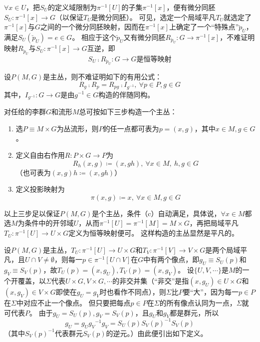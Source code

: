 \begin{note}
    $\forall x \in U$，把$S_U$的定义域限制为$\pi^{-1}[U]$的子集$\pi^{-1}[x]$，便有微分同胚$S_U \colon \pi^{-1}[x] \to G$（以保证$T_U$是微分同胚）。
    可见，选定一个局域平凡$T_U$就选定了$\pi^{-1}[x]$与$G$之间的一个微分同胚映射，因而在$\pi^{-1}[x]$上确定了一个``特殊点''$\breve{p}_U$，满足$S_U(\breve{p}_U) = e \in G$。
    相应于这个$\breve{p}_U$又有微分同胚$R_{\breve{p}_U} \colon G \to \pi^{-1}[x]$，不难证明映射$R_{\breve{p}_U}$与$S_U \colon \pi^{-1}[x] \to G$互逆，即
    $$S_U \comp R_{\breve{p}_U} \colon G \to G \text{是恒等映射}$$
\end{note}

\begin{note}
    设$P(M, G)$是主丛，则不难证明如下的有用公式：
    $$R_g \comp R_p = R_{pg} \comp I_{g^{-1}}, ~ \forall p \in P, g \in G$$
    其中，$I_{g^{-1}} \colon G \to G$是由$g^{-1} \in G$构造的伴随同构。
\end{note}

\begin{example}
    对任给的李群$G$和流形$M$总可按如下三步构造一个主丛：
    \begin{enumerate}[（1）]
        \item 选$P \equiv M \times G$为丛流形，则$P$的任一点都可表为$p = (x, g)$，其中$x \in M, g \in G$。
        \item 定义自由右作用$R \colon P \times G \to P$为
        $$R_h(x, g) \coloneq (x, gh), ~ \forall x \in M, ~ h,g \in G$$
        （也可表为$(x, g)h \coloneq (x, gh)$）
        \item 定义投影映射为
        $$\pi(x, g) \coloneq x, ~ \forall x \in M, g \in G$$
    \end{enumerate}
    以上三步足以保证$P(M, G)$是个主丛，条件（c）自动满足，具体说，$\forall x \in M$都选$M$为条件中的开邻域$U$，从而$\pi^{-1}[U] = \pi^{-1}[M] = M \times G$，再把局域平凡$T_U \colon \pi^{-1}[U] \to U \times G$定义为恒等映射便可。
    这样构造的主丛显然是平凡的。
\end{example}

设$P(M, G)$是主丛，$T_U \colon \pi^{-1}[U] \to U \times G$和$T_V \colon \pi^{-1}[V] \to V \times G$是两个局域平凡，且$U \cap V \neq \emptyset$，则每一$p \in \pi^{-1}[U \cap V]$在$G$中有两个像点，即$g_U \equiv S_U(p)$和$g_V \equiv S_V(p)$，故$T_U(p) = (x, g_U), T_V(p) = (x, g_V)$。
设$\{U, V, \cdots\}$是$M$的一个开覆盖，以$\Sigma$代表$U \times G, V \times G, \cdots$的非交并集（``非交''是指$(x, g_U) \in U \times G$和$(x, g_V) \in V \times G$即使在$g_U = g_V$时也看作不同点），则$\Sigma$比$P$要``大''，因为每一$p \in P$在$\Sigma$中对应不止一个像点。
但只要把每点$p \in P$在$\Sigma$的所有像点认同为一点，$\Sigma$就可代表$P$。
由于$g_U = S_U(p), g_V = S_V(p)$，且$g_U$和$g_V$都是群元，所以
$$g_U = g_U{g_V}^{-1}g_V = S_U(p){S_V(p)}^{-1}S_V(p)$$
（其中${S_V(p)}^{-1}$代表群元$S_V(p)$的逆元。）由此便引出如下定义。

